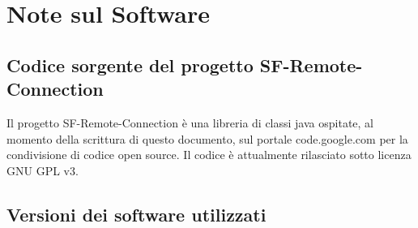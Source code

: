 
\chapter{Note sul Software}
\label{a:notesoftware}

\section{Codice sorgente del progetto SF-Remote-Connection}
\label{sec:sfrcsource}
Il progetto SF-Remote-Connection è una libreria di classi java ospitate, al momento della scrittura di questo documento, sul portale %
code.google.com per la condivisione di codice open source.
Il codice è attualmente rilasciato sotto licenza GNU GPL v3.



\section{Versioni dei software utilizzati}
\label{s:versionisw}